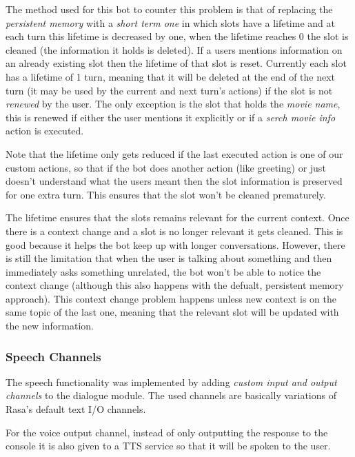 \documentclass[11pt,a4paper]{article}
\begin{document}
			The method used for this bot to counter this problem is that of replacing the \textit{persistent memory} with a \textit{short term one} in which slots have a lifetime and at each turn this lifetime is decreased by one, when the lifetime reaches 0 the slot is cleaned (the information it holds is deleted). If a users mentions information on an already existing slot then the lifetime of that slot is reset. Currently each slot has a lifetime of 1 turn, meaning that it will be deleted at the end of the next turn (it may be used by the current and next turn's actions) if the slot is not \textit{renewed} by the user. The only exception is the slot that holds the \textit{movie name}, this is renewed if either the user mentions it explicitly or if a \textit{serch movie info} action is executed. 
			
			Note that the lifetime only gets reduced if the last executed action is one of our custom actions, so that if the bot does another action (like greeting) or just doesn't understand what the users meant then the slot information is preserved for one extra turn. This ensures that the slot won't be cleaned prematurely.
			
			The lifetime ensures that the slots remains relevant for the current context. Once there is a context change and a slot is no longer relevant it gets cleaned. This is good because it helps the bot keep up with longer conversations. However, there is still the limitation that when the user is talking about something and then immediately asks something unrelated, the bot won't be able to notice the context change (although this also happens with the defualt, persistent memory approach). This context change problem happens unless new context is on the same topic of the last one, meaning that the relevant slot will be updated with the new information.
			
		\subsubsection{Speech Channels}
		\label{sec-speech}
		
			The speech functionality was implemented by adding \textit{custom input and output channels} to the dialogue module. The used channels are basically variations of Rasa's default text I/O channels. 
			
			For the voice output channel, instead of only outputting the response to the console it is also given to a TTS service so that it will be spoken to the user. 
			
\end{document}
